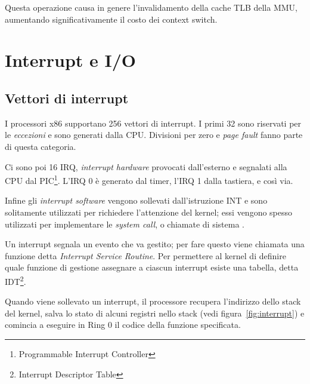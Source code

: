 \documentclass[12pt,a4paper]{report}
\begin{document}
		Questa operazione causa in genere l'invalidamento della cache TLB della MMU, aumentando significativamente
		il costo dei context switch.
		
	\section{Interrupt e I/O}
		\subsection{Vettori di interrupt}
			I processori x86 supportano 256 vettori di interrupt.
			I primi 32 sono riservati per le \emph{eccezioni} e sono generati dalla CPU. Divisioni per zero e \emph{page fault}
			fanno parte di questa categoria.
			
			Ci sono poi 16 IRQ, \emph{interrupt hardware} provocati dall'esterno e segnalati alla CPU dal PIC\footnote{Programmable Interrupt Controller}.
			L'IRQ 0 è generato dal timer, l'IRQ 1 dalla tastiera, e così via.
			
			Infine gli \emph{interrupt software} vengono sollevati dall'istruzione INT e sono solitamente utilizzati per richiedere l'attenzione del kernel;
			essi vengono spesso utilizzati per implementare le \emph{system call}, o chiamate di sistema \cite{OSDEV_Interrupts}.
			
			Un interrupt segnala un evento che va gestito; per fare questo viene chiamata una funzione detta \emph{Interrupt Service Routine}.
			Per permettere al kernel di definire quale funzione di gestione assegnare a ciascun interrupt esiste una tabella, detta IDT\footnote{Interrupt Descriptor Table}.
			
			Quando viene sollevato un interrupt, il processore recupera l'indirizzo dello stack del kernel, salva lo stato di alcuni registri
			nello stack (vedi figura~\ref{fig:interrupt}) e comincia a eseguire in Ring 0 il codice della funzione specificata.
						
\end{document}
